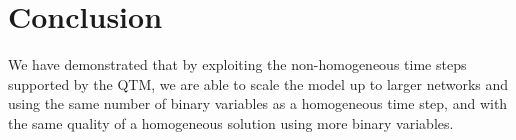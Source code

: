 \section{Conclusion}
We have demonstrated that by exploiting the non-homogeneous time steps supported by the QTM, we are able to scale the model up to larger networks and using the same number of binary variables as a homogeneous time step, and with the same quality of a homogeneous solution using more binary variables.
